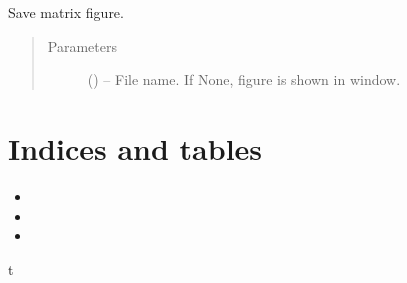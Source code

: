\documentclass[letterpaper,10pt,english]{sphinxmanual}
\begin{document}
\begin{fulllineitems}
\begin{fulllineitems}
\label{\detokenize{index:tigramite.plotting.setup_matrix.savefig}}
Save matrix figure.
\begin{quote}\begin{description}
\item[{Parameters}] \leavevmode
{} (\sphinxstyleliteralemphasis{, }\sphinxstyleliteralemphasis{ (}\sphinxstyleliteralemphasis{)}\sphinxstyleliteralemphasis{}) -- File name. If None, figure is shown in window.

\end{description}\end{quote}

\end{fulllineitems}


\end{fulllineitems}



\chapter{Indices and tables}
\label{\detokenize{index:indices-and-tables}}\begin{itemize}
\item {} 

\item {} 

\item {} 

\end{itemize}


\renewcommand{\indexname}{Python Module Index}
\begin{sphinxtheindex}
\def\bigletter#1{{\Large\sffamily#1}\nopagebreak\vspace{1mm}}
\bigletter{t}
\item {}
\item {}
\end{sphinxtheindex}

\renewcommand{\indexname}{Index}
\printindex
\end{document}
